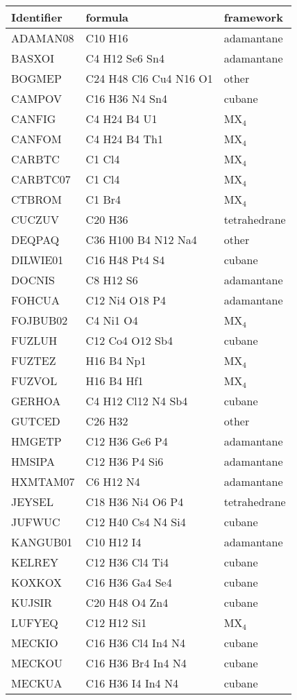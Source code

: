 \documentclass{article}
\begin{document}
\begin{tabular}{lll}
Identifier & formula & framework\\
\hline
ADAMAN08 & C10 H16 & adamantane \\
BASXOI & C4 H12 Se6 Sn4 & adamantane \\
BOGMEP & C24 H48 Cl6 Cu4 N16 O1 & other \\
CAMPOV & C16 H36 N4 Sn4 & cubane\\
CANFIG & C4 H24 B4 U1 & MX$_4$\\
CANFOM & C4 H24 B4 Th1 & MX$_4$\\
CARBTC & C1 Cl4 & MX$_4$\\
CARBTC07 & C1 Cl4 & MX$_4$\\
CTBROM & C1 Br4 & MX$_4$\\
CUCZUV & C20 H36 & tetrahedrane\\
DEQPAQ & C36 H100 B4 N12 Na4 & other\\
DILWIE01 & C16 H48 Pt4 S4 & cubane\\
DOCNIS & C8 H12 S6 & adamantane\\
FOHCUA & C12 Ni4 O18 P4 & adamantane\\
FOJBUB02 & C4 Ni1 O4 & MX$_4$\\
FUZLUH & C12 Co4 O12 Sb4 & cubane\\
FUZTEZ & H16 B4 Np1 & MX$_4$\\
FUZVOL & H16 B4 Hf1 & MX$_4$\\
GERHOA & C4 H12 Cl12 N4 Sb4 & cubane\\
GUTCED & C26 H32 & other\\
HMGETP & C12 H36 Ge6 P4 & adamantane\\
HMSIPA & C12 H36 P4 Si6 & adamantane\\
HXMTAM07 & C6 H12 N4 & adamantane\\
JEYSEL & C18 H36 Ni4 O6 P4 & tetrahedrane\\
JUFWUC & C12 H40 Cs4 N4 Si4 & cubane\\
KANGUB01 & C10 H12 I4 & adamantane\\
KELREY & C12 H36 Cl4 Ti4 & cubane\\
KOXKOX & C16 H36 Ga4 Se4 & cubane\\
KUJSIR & C20 H48 O4 Zn4 & cubane\\
LUFYEQ & C12 H12 Si1 & MX$_4$\\
MECKIO & C16 H36 Cl4 In4 N4 & cubane\\
MECKOU & C16 H36 Br4 In4 N4 & cubane\\
MECKUA & C16 H36 I4 In4 N4 & cubane\\

\end{tabular}
\end{document}
